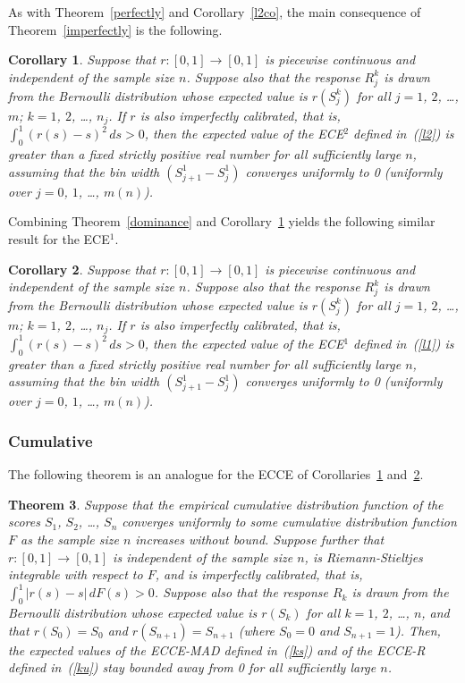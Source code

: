 \documentclass{article}
\newtheorem{theorem}{Theorem}[]
\newtheorem{corollary}[theorem]{Corollary}
\begin{document}
As with Theorem~\ref{perfectly} and Corollary~\ref{l2co}, the main consequence
of Theorem~\ref{imperfectly} is the following.

\begin{corollary}
\label{altl2co}
Suppose that $r : [0, 1] \to [0, 1]$ is piecewise continuous
and independent of the sample size $n$.
Suppose also that the response $R_j^k$ is drawn from the Bernoulli distribution
whose expected value is $r(S_j^k)$ for all $j = 1$, $2$, \dots, $m$;
$k = 1$, $2$, \dots, $n_j$.
If $r$ is also imperfectly calibrated,
that is, $\int_0^1 (r(s) - s)^2 \, ds > 0$,
then the expected value of the ECE$^2$ defined in~(\ref{l2}) is greater
than a fixed strictly positive real number for all sufficiently large $n$,
assuming that the bin width $(S_{j+1}^1 - S_j^1)$ converges uniformly to 0
(uniformly over $j = 0$, $1$, \dots, $m(n)$).
\end{corollary}

Combining Theorem~\ref{dominance} and Corollary~\ref{altl2co}
yields the following similar result for the ECE$^1$.

\begin{corollary}
\label{altl1co}
Suppose that $r : [0, 1] \to [0, 1]$ is piecewise continuous
and independent of the sample size $n$.
Suppose also that the response $R_j^k$ is drawn from the Bernoulli distribution
whose expected value is $r(S_j^k)$ for all $j = 1$, $2$, \dots, $m$;
$k = 1$, $2$, \dots, $n_j$.
If $r$ is also imperfectly calibrated,
that is, $\int_0^1 (r(s) - s)^2 \, ds > 0$,
then the expected value of the ECE$^1$ defined in~(\ref{l1}) is greater
than a fixed strictly positive real number for all sufficiently large $n$,
assuming that the bin width $(S_{j+1}^1 - S_j^1)$ converges uniformly to 0
(uniformly over $j = 0$, $1$, \dots, $m(n)$).
\end{corollary}


\subsubsection{Cumulative}

The following theorem is an analogue
for the ECCE of Corollaries~\ref{altl2co} and~\ref{altl1co}.

\begin{theorem}
\label{eccethm}
Suppose that the empirical cumulative distribution function
of the scores $S_1$, $S_2$, \dots, $S_n$ converges uniformly
to some cumulative distribution function $F$ as the sample size $n$
increases without bound.
Suppose further that $r : [0, 1] \to [0, 1]$ is independent
of the sample size $n$, is Riemann-Stieltjes integrable with respect to $F$,
and is imperfectly calibrated, that is,
$\int_0^1 |r(s) - s| \, dF(s) > 0$.
Suppose also that the response $R_k$ is drawn from the Bernoulli distribution
whose expected value is $r(S_k)$ for all $k = 1$, $2$, \dots, $n$, and that
$r(S_0) = S_0$ and $r(S_{n+1}) = S_{n+1}$ (where $S_0 = 0$ and $S_{n+1} = 1$).
Then, the expected values of the ECCE-MAD defined in~(\ref{ks})
and of the ECCE-R defined in~(\ref{ku}) stay bounded away from 0
for all sufficiently large $n$.
\end{theorem}
\end{document}
